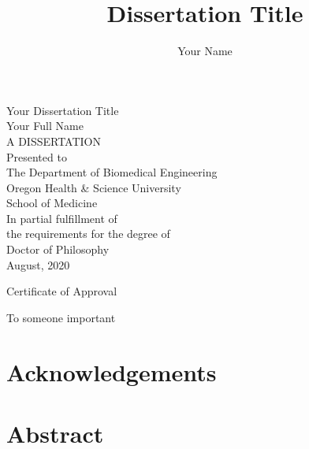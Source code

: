 \documentclass[11pt]{book}
\author{Your Name}
\title{Dissertation Title}
\begin{document}

\frontmatter
{}

\thispagestyle{empty}

\center
\vspace*{1in}
\huge{Your Dissertation Title} \\
\vspace{1in}
\Large{Your Full Name} \\
\vspace{2in}
\normalsize
A DISSERTATION \\
\vspace{0.5in}
Presented to \\
The Department of Biomedical Engineering \\
Oregon Health \& Science University \\
School of Medicine \\
\vspace{0.25in}
In partial fulfillment of\\
the requirements for the degree of \\
\vspace{0.25in}
Doctor of Philosophy \\
\vspace{\fill}
August, 2020


\newpage
\thispagestyle{empty}
\Large{Certificate of Approval}
\normalsize
\justify

\newpage
\vspace*{\fill}
To someone important
\vspace*{\fill}



\tableofcontents

\listoffigures

\listoftables

\doublespacing

\chapter*{Acknowledgements}


\chapter*{Abstract}

\end{document}
